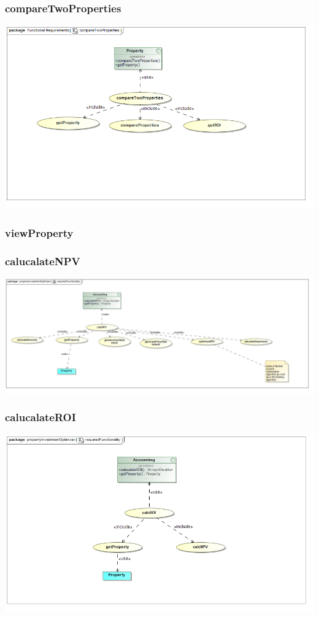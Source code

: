 \documentclass[a4paper,12pt]{article}
\begin{document}
\subsubsection{compareTwoProperties}
\includegraphics[width=1\textwidth]{./Images/requiredFunctionality/compareTwoProperties.png}
\subsubsection{viewProperty}

\subsubsection{calucalateNPV}
\includegraphics[width=1\textwidth]{./Images/newDiagrams/requiredFunctionality/Priscilla/requiredFunctionalityNPV.jpg}
\subsubsection{calucalateROI}
\includegraphics[width=1\textwidth]{./Images/newDiagrams/requiredFunctionality/Priscilla/requiredFunctionalityROI.jpg}
\end{document}
